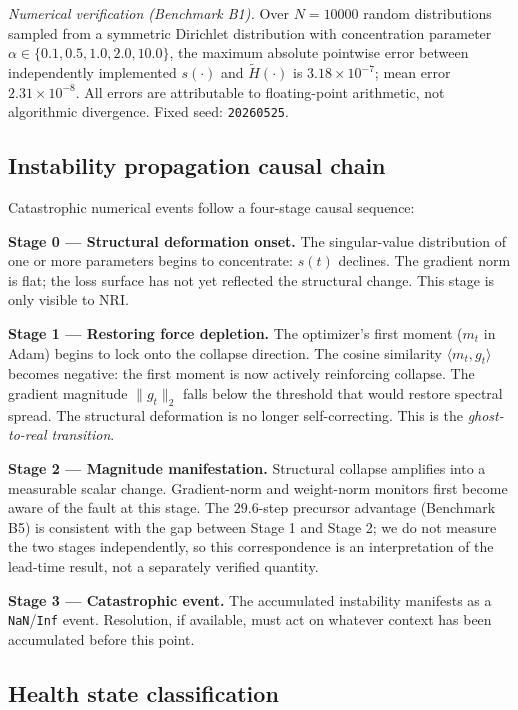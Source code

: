 \documentclass[11pt,a4paper]{article}
\theoremstyle{plain}
\begin{document}
\textit{Numerical verification (Benchmark B1).}
Over $N = \num{10000}$ random distributions sampled from a symmetric
Dirichlet distribution with concentration parameter
$\alpha \in \{0.1, 0.5, 1.0, 2.0, 10.0\}$, the maximum absolute
pointwise error between independently implemented $s(\cdot)$ and
$\tilde{H}(\cdot)$ is $3.18 \times 10^{-7}$;
mean error $2.31 \times 10^{-8}$.
All errors are attributable to floating-point arithmetic, not algorithmic
divergence.
Fixed seed: \texttt{20260525}.

\subsection{Instability propagation causal chain}
\label{sec:propagation}

Catastrophic numerical events follow a four-stage causal sequence:

\textbf{Stage 0 --- Structural deformation onset.}
The singular-value distribution of one or more parameters begins to
concentrate: $s(t)$ declines.
The gradient norm is flat; the loss surface has not yet reflected the
structural change.
This stage is only visible to NRI.

\textbf{Stage 1 --- Restoring force depletion.}
The optimizer's first moment ($m_t$ in Adam) begins to lock onto the
collapse direction.
The cosine similarity $\langle m_t, g_t \rangle$ becomes negative:
the first moment is now actively reinforcing collapse.
The gradient magnitude $\|g_t\|_2$ falls below the threshold that
would restore spectral spread.
The structural deformation is no longer self-correcting.
This is the \emph{ghost-to-real transition}.

\textbf{Stage 2 --- Magnitude manifestation.}
Structural collapse amplifies into a measurable scalar change.
Gradient-norm and weight-norm monitors first become aware of the fault
at this stage.
The $29.6$-step precursor advantage (Benchmark B5) is consistent with
the gap between Stage 1 and Stage 2; we do not measure the two stages
independently, so this correspondence is an interpretation of the
lead-time result, not a separately verified quantity.

\textbf{Stage 3 --- Catastrophic event.}
The accumulated instability manifests as a \texttt{NaN}/\texttt{Inf}
event.
Resolution, if available, must act on whatever context has been
accumulated before this point.

\subsection{Health state classification}
\label{sec:classification}
\end{document}
